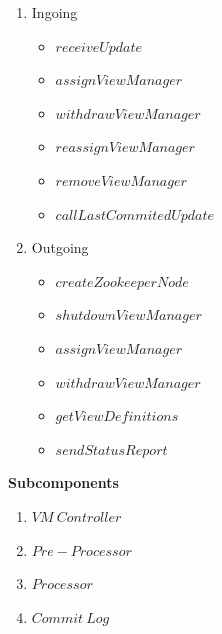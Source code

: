 \begin{enumerate}
	\item Ingoing
	\begin{itemize}
		\item $receiveUpdate$
		\item $assignViewManager$
		\item $withdrawViewManager$
		\item $reassignViewManager$
		\item $removeViewManager$
		\item $callLastCommitedUpdate$
	\end{itemize}
	\item Outgoing
	\begin{itemize}
		\item $createZookeeperNode$
		\item $shutdownViewManager$
		\item $assignViewManager$
		\item $withdrawViewManager$
		\item $getViewDefinitions$
		\item $sendStatusReport$

	\end{itemize}
\end{enumerate}

\textbf{Subcomponents}

\begin{enumerate}
	\item $VM\:Controller$
	\item $Pre-Processor$
	\item $Processor$
	\item $Commit\:Log$
\end{enumerate}

\newpage

